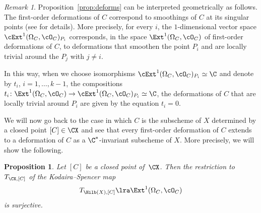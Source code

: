 \documentclass[11pt]{amsart}
\numberwithin{equation}{section}
\newtheorem{proposition}[theorem]{Proposition}
\theoremstyle{definition}
\theoremstyle{remark}
\newtheorem{remark}[theorem]{Remark}
\begin{document}
\begin{remark}\label{rem:deforms}
  Proposition~\ref{prop:deforms} can be interpreted geometrically as follows. The first-order deformations of $C$ correspond to smoothings of $C$ at its singular points (see \cite[Sections~6.3 and~6.4]{Talpo} for details).  More precisely, for every $i$, the $1$-dimensional vector space $\cExt^1(\Omega_C,\cO_C)_{P_i}$ corresponds, in the space $\Ext^1(\Omega_C,\cO_C)$ of first-order deformations of $C$, to deformations that smoothen the point $P_i$ and are locally trivial around the $P_j$ with $j\neq i$.

In this way, when we choose isomorphisms $\cExt^1(\Omega_C,\cO_C)_{P_i}\simeq \C$ and denote by $t_i$, $i=1,\dots , k-1$, the compositions
$t_i\colon\Ext^1(\Omega_C,\cO_C)\to \cExt^1(\Omega_C,\cO_C)_{P_i}\simeq \C$,  the deformations of $C$ that are locally trivial around $P_i$ are given by the equation $t_i=0$.
\end{remark}

We will now go back to the case in which $C$ is the subscheme of $X$ determined by a closed point $[C]\in \CX$ and see that every first-order deformation of  $C$ extends to a deformation of $C$ as a $\C^*$-invariant subscheme of $X$. More precisely, we will show the following. 

\begin{proposition}\label{prop:kodspen}
Let $[C]$ be a closed point of\, $\CX$. Then  the restriction to $T_{\CX,[C]}$ of the Kodaira--Spencer map 
\[
T_{\Hilb(X),[C]}\lra \Ext^1(\Omega_C,\cO_C)
\]
is surjective.
\end{proposition}
\end{document}
